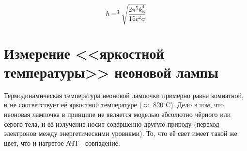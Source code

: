 	\[ h = ^3\sqrt{\frac{2 \pi^5 k_{\text{Б}}^4}{15 c^2 \sigma}} \]

	\begin{center}
	\end{center}

	\section*{Измерение <<яркостной температуры>> неоновой лампы}

	Термодинамическая температура неоновой лампочки примерно равна комнатной, и не соответствует её яркостной температуре ($\approx$ 820$^{\circ}$C). 
	Дело в том, что неоновая лампочка в принципе не является моделью абсолютно чёрного или серого тела, 
	и её излучение носит совершенно другую природу (переход электронов между энергетическими уровнями). 
	То, что её свет имеет такой же цвет, что и нагретое АЧТ - совпадение.
